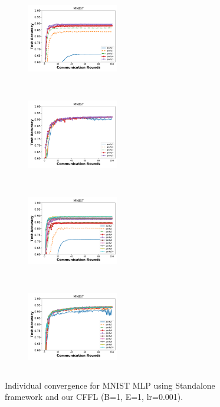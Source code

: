 \documentclass{article}
\begin{document}
\begin{figure}[!htp]
\centering
        \begin{subfigure}[ht]{0.23\textwidth}
                \includegraphics[width=4cm,height=3.8cm]{mnist_deep_p5e100_standalone}\label{fig:mnist_deep_p5e100_standalone}
        \end{subfigure}
        \begin{subfigure}[ht]{0.23\textwidth}
                \includegraphics[width=4cm,height=3.8cm]{mnist_deep_p5e100_cffl}\label{fig:mnist_deep_p5e100_cffl}
        \end{subfigure}
        \begin{subfigure}[ht]{0.23\textwidth}
                \includegraphics[width=4cm,height=3.8cm]{mnist_deep_p10e100_standalone}\label{fig:mnist_deep_p10e100_standalone}
        \end{subfigure}
        \begin{subfigure}[ht]{0.23\textwidth}
                \includegraphics[width=4cm,height=3.8cm]{mnist_deep_p10e100_cffl}\label{fig:mnist_deep_p10e100_cffl}
        \end{subfigure}
        \caption{Individual convergence for MNIST MLP using Standalone framework and our CFFL (B=1, E=1, lr=0.001).}%
\label{fig:mnist_p5p10_mlp_convergence}
\end{figure}
\end{document}
